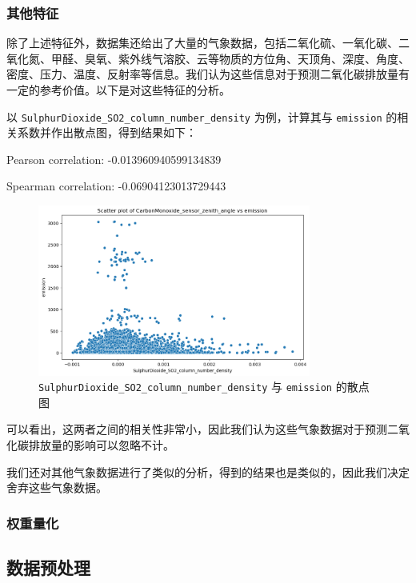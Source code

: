 \documentclass{ctexart}
\begin{document}
\subsubsection{其他特征}

除了上述特征外，数据集还给出了大量的气象数据，包括二氧化硫、一氧化碳、二氧化氮、甲醛、臭氧、紫外线气溶胶、云等物质的方位角、天顶角、深度、角度、密度、压力、温度、反射率等信息。我们认为这些信息对于预测二氧化碳排放量有一定的参考价值。以下是对这些特征的分析。

以 \texttt{SulphurDioxide\_SO2\_column\_number\_density} 为例，计算其与 \texttt{emission} 的相关系数并作出散点图，得到结果如下：

\begin{center}
Pearson correlation: -0.013960940599134839

Spearman correlation: -0.06904123013729443
\end{center}


\begin{figure}[H]
      \centering
      \includegraphics[width=0.8\textwidth]{output1.png}
      \caption{\texttt{SulphurDioxide\_SO2\_column\_number\_density} 与 \texttt{emission} 的散点图}
\end{figure}

可以看出，这两者之间的相关性非常小，因此我们认为这些气象数据对于预测二氧化碳排放量的影响可以忽略不计。

我们还对其他气象数据进行了类似的分析，得到的结果也是类似的，因此我们决定舍弃这些气象数据。

\subsubsection{权重量化}


\subsection{数据预处理}
\end{document}
